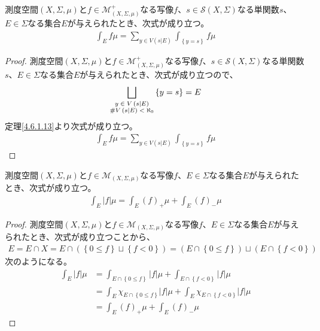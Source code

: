 \documentclass[dvipdfmx]{jsarticle}
\begin{document}
\begin{thm}\label{4.6.1.14}
測度空間$(X,\varSigma,\mu)$と$f \in \mathcal{M}_{(X,\varSigma,\mu)}^{+}$なる写像$f$、$s \in \mathcal{S}(X,\varSigma)$なる単関数$s$、$E \in \varSigma$なる集合$E$が与えられたとき、次式が成り立つ。
\begin{align*}
\int_{E} {f\mu} = \sum_{y \in V\left( s|E \right)} {\int_{\left\{ y = s \right\}} {f\mu}}
\end{align*}
\end{thm}
\begin{proof}
測度空間$(X,\varSigma,\mu)$と$f \in \mathcal{M}_{(X,\varSigma,\mu)}^{+}$なる写像$f$、$s \in \mathcal{S}(X,\varSigma)$なる単関数$s$、$E \in \varSigma$なる集合$E$が与えられたとき、次式が成り立つので、
\begin{align*}
\bigsqcup_{\scriptsize \begin{matrix}
y \in V\left( s|E \right) \\
\#{V\left( s|E \right)} < \aleph_{0} \\
\end{matrix}} \left\{ y = s \right\} = E
\end{align*}
定理\ref{4.6.1.13}より次式が成り立つ。
\begin{align*}
\int_{E} {f\mu} = \sum_{y \in V\left( s|E \right)} {\int_{\left\{ y = s \right\}} {f\mu}}
\end{align*}
\end{proof}
\begin{thm}\label{4.6.1.15}
測度空間$(X,\varSigma,\mu)$と$f \in \mathcal{M}_{(X,\varSigma,\mu)}$なる写像$f$、$E \in \varSigma$なる集合$E$が与えられたとき、次式が成り立つ。
\begin{align*}
\int_{E} {|f|\mu} = \int_{E} {(f)_{+}\mu} + \int_{E} {(f)_{-}\mu}
\end{align*}
\end{thm}
\begin{proof}
測度空間$(X,\varSigma,\mu)$と$f \in \mathcal{M}_{(X,\varSigma,\mu)}$なる写像$f$、$E \in \varSigma$なる集合$E$が与えられたとき、次式が成り立つことから、
\begin{align*}
E = E \cap X = E \cap \left( \left\{ 0 \leq f \right\} \sqcup \left\{ f < 0 \right\} \right) = \left( E \cap \left\{ 0 \leq f \right\} \right) \sqcup \left( E \cap \left\{ f < 0 \right\} \right)
\end{align*}
次のようになる。
\begin{align*}
\int_{E} {|f|\mu} &= \int_{E \cap \left\{ 0 \leq f \right\}} {|f|\mu} + \int_{E \cap \left\{ f < 0 \right\}} {|f|\mu}\\
&= \int_{E} {\chi_{E \cap \left\{ 0 \leq f \right\}}|f|\mu} + \int_{E} {\chi_{E \cap \left\{ f < 0 \right\}}|f|\mu}\\
&= \int_{E} {(f)_{+}\mu} + \int_{E} {(f)_{-}\mu}
\end{align*}
\end{proof}
\end{document}
